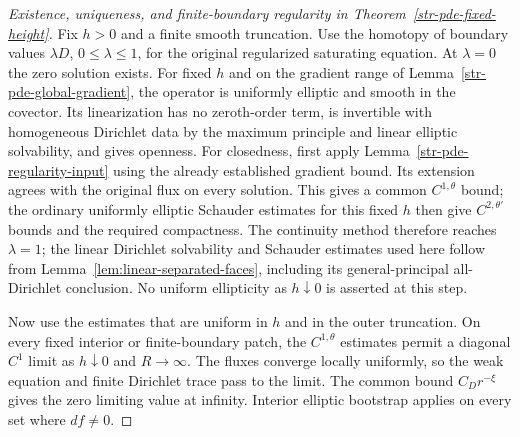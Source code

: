 \begin{proof}[Existence, uniqueness, and finite-boundary regularity in
Theorem~\ref{str-pde-fixed-height}]
Fix $h>0$ and a finite smooth truncation. Use the homotopy of
boundary values $\lambda D$, $0\leq\lambda\leq1$, for the original
regularized saturating equation. At $\lambda=0$ the zero solution
exists. For fixed $h$ and on the gradient range of
Lemma~\ref{str-pde-global-gradient}, the operator is uniformly
elliptic and smooth in the covector. Its linearization has no
zeroth-order term, is invertible with homogeneous Dirichlet data
by the maximum principle and linear elliptic solvability, and
gives openness. For closedness, first apply
Lemma~\ref{str-pde-regularity-input} using the already established
gradient bound. Its extension agrees with the original flux on
every solution. This gives a common $C^{1,\theta}$ bound; the
ordinary uniformly elliptic Schauder estimates for this fixed
$h$ then give $C^{2,\theta'}$ bounds and the required compactness.
The continuity method therefore reaches $\lambda=1$; the linear
Dirichlet solvability and Schauder estimates used here follow from
Lemma~\ref{lem:linear-separated-faces}, including its general-principal
all-Dirichlet conclusion.
No uniform ellipticity as $h\downarrow0$ is asserted at this step.

Now use the estimates that are uniform in $h$ and in the outer
truncation. On every fixed interior or finite-boundary patch,
the $C^{1,\theta}$ estimates permit a diagonal $C^1$ limit as
$h\downarrow0$ and $R\to\infty$. The fluxes converge locally
uniformly, so the weak equation and finite Dirichlet trace pass
to the limit. The common bound $C_Dr^{-\xi}$ gives the zero
limiting value at infinity. Interior elliptic bootstrap applies
on every set where $df\ne0$.


\end{proof}
